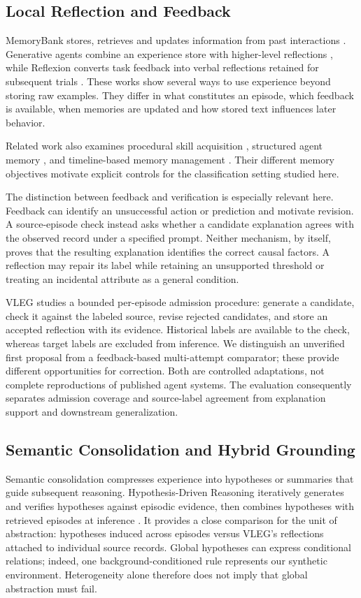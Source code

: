 \documentclass[onecolumn]{IEEEtran}
\numberwithin{equation}{section}
\theoremstyle{definition}
\theoremstyle{remark}
\begin{document}
\subsection{Local Reflection and Feedback}
MemoryBank stores, retrieves and updates information from past interactions \cite{zhong2024memorybank}. Generative agents combine an experience store with higher-level reflections \cite{park2023generative}, while Reflexion converts task feedback into verbal reflections retained for subsequent trials \cite{shinn2023reflexion}. These works show several ways to use experience beyond storing raw examples. They differ in what constitutes an episode, which feedback is available, when memories are updated and how stored text influences later behavior.

Related work also examines procedural skill acquisition \cite{wang2024voyager}, structured agent memory \cite{xu2025amem}, and timeline-based memory management \cite{kim2024towards}. Their different memory objectives motivate explicit controls for the classification setting studied here.

The distinction between feedback and verification is especially relevant here. Feedback can identify an unsuccessful action or prediction and motivate revision. A source-episode check instead asks whether a candidate explanation agrees with the observed record under a specified prompt. Neither mechanism, by itself, proves that the resulting explanation identifies the correct causal factors. A reflection may repair its label while retaining an unsupported threshold or treating an incidental attribute as a general condition.

VLEG studies a bounded per-episode admission procedure: generate a candidate, check it against the labeled source, revise rejected candidates, and store an accepted reflection with its evidence. Historical labels are available to the check, whereas target labels are excluded from inference. We distinguish an unverified first proposal from a feedback-based multi-attempt comparator; these provide different opportunities for correction. Both are controlled adaptations, not complete reproductions of published agent systems. The evaluation consequently separates admission coverage and source-label agreement from explanation support and downstream generalization.

\subsection{Semantic Consolidation and Hybrid Grounding}
Semantic consolidation compresses experience into hypotheses or summaries that guide subsequent reasoning. Hypothesis-Driven Reasoning iteratively generates and verifies hypotheses against episodic evidence, then combines hypotheses with retrieved episodes at inference \cite{agarwal2026hypothesis}. It provides a close comparison for the unit of abstraction: hypotheses induced across episodes versus VLEG's reflections attached to individual source records. Global hypotheses can express conditional relations; indeed, one background-conditioned rule represents our synthetic environment. Heterogeneity alone therefore does not imply that global abstraction must fail.
\end{document}
